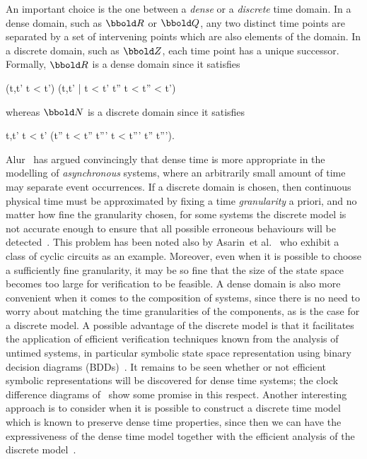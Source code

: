 An important choice is the one between a \emph{dense} or a
\emph{discrete} time domain. In a dense domain, such as $\Time$ or $\rat$, 
any two distinct time points are separated by a set of intervening
points which are also elements of the domain. In a discrete
domain, such as $\num$, each time point has a unique
successor. Formally, $\Time$ is a dense domain since it satisfies
\begin{zed} 
(\exists t,t' \in \Time \such t < t') \land
(\forall t,t' \in \Time | t < t' \such \exists t'' \in \Time
\such t < t'' < t')
\end{zed}
whereas $\nat$ is a discrete domain since it satisfies
\begin{zed}
\forall t,t' \in \nat \such t < t' \implies (\exists t'' \in \nat \such
t < t'' \land \forall t''' \in \nat \such t < t''' \implies t'' \leq t''').
\end{zed} 
Alur~\cite{alu:91} has argued convincingly that dense time is more
appropriate in the modelling of \emph{asynchronous} systems, where an
arbitrarily small amount of time may separate event occurrences. If a
discrete domain is chosen, then continuous physical time must be
approximated by fixing a time
\emph{granularity} a priori, and no matter how fine the granularity
chosen, for some systems the discrete model is not accurate enough to
ensure that all possible erroneous behaviours will be
detected~\cite{acd:93}. This problem has been noted also by Asarin~et
al.~\cite{amp:98a} who exhibit a class of cyclic circuits as an
example. Moreover, even when it is possible to choose a sufficiently
fine granularity, it may be so fine that the size of the state space
becomes too large for verification to be feasible. A dense domain is
also more convenient when it comes to the composition of systems,
since there is no need to worry about matching the time granularities
of the components, as is the case for a discrete model. A possible
advantage of the discrete model is that it facilitates the application
of efficient verification techniques known from the analysis of
untimed systems, in particular symbolic state space representation
using binary decision diagrams (BDDs)~\cite{bry:86,mcm:92}. It remains
to be seen whether or not efficient symbolic representations will be
discovered for dense time systems; the clock difference diagrams
of~\cite{lwy:98} show some promise in this respect. Another
interesting approach is to consider when it is possible to construct a
discrete time model which is known to preserve dense time properties,
since then we can have the expressiveness of the dense time model
together with the efficient analysis of the discrete
model~\cite{abk:97,amp:98a,bmp:97,hmp:92}.

